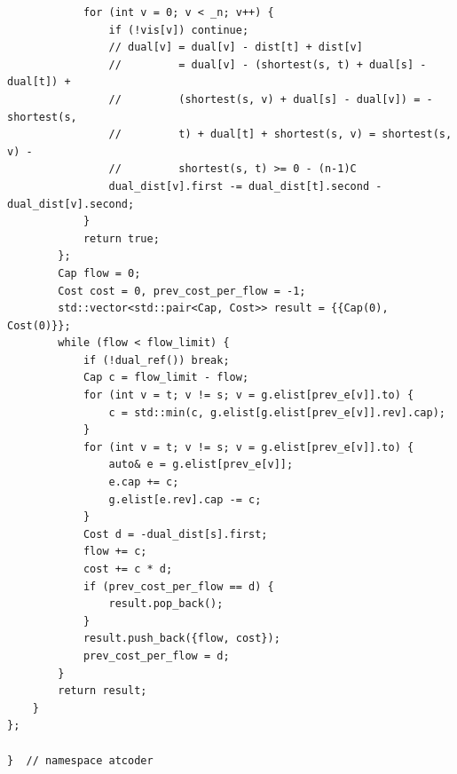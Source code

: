 \documentclass[UTF8]{article}
\begin{document}
\begin{verbatim}
            for (int v = 0; v < _n; v++) {
                if (!vis[v]) continue;
                // dual[v] = dual[v] - dist[t] + dist[v]
                //         = dual[v] - (shortest(s, t) + dual[s] - dual[t]) +
                //         (shortest(s, v) + dual[s] - dual[v]) = - shortest(s,
                //         t) + dual[t] + shortest(s, v) = shortest(s, v) -
                //         shortest(s, t) >= 0 - (n-1)C
                dual_dist[v].first -= dual_dist[t].second - dual_dist[v].second;
            }
            return true;
        };
        Cap flow = 0;
        Cost cost = 0, prev_cost_per_flow = -1;
        std::vector<std::pair<Cap, Cost>> result = {{Cap(0), Cost(0)}};
        while (flow < flow_limit) {
            if (!dual_ref()) break;
            Cap c = flow_limit - flow;
            for (int v = t; v != s; v = g.elist[prev_e[v]].to) {
                c = std::min(c, g.elist[g.elist[prev_e[v]].rev].cap);
            }
            for (int v = t; v != s; v = g.elist[prev_e[v]].to) {
                auto& e = g.elist[prev_e[v]];
                e.cap += c;
                g.elist[e.rev].cap -= c;
            }
            Cost d = -dual_dist[s].first;
            flow += c;
            cost += c * d;
            if (prev_cost_per_flow == d) {
                result.pop_back();
            }
            result.push_back({flow, cost});
            prev_cost_per_flow = d;
        }
        return result;
    }
};

}  // namespace atcoder
\end{verbatim}
\end{document}
